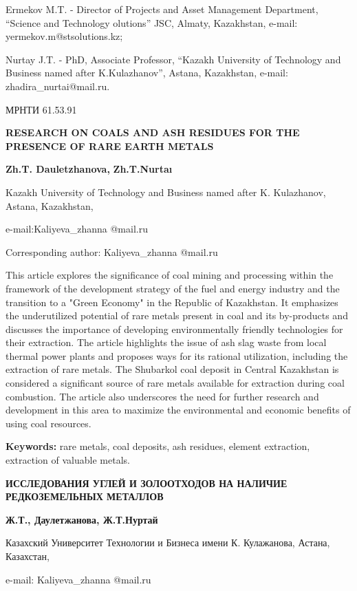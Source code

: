 Ermekov M.T. - Director of Projects and Asset Management Department,
``Science and Technology olutions'' JSC, Almaty, Kazakhstan, e-mail:
yermekov.m@stsolutions.kz;

Nurtay J.T. - PhD, Associate Professor, ``Kazakh University of
Technology and Business named after K.Kulazhanov'', Astana, Kazakhstan,
e-mail: zhadira\_nurtai@mail.ru.

МРНТИ 61.53.91

\textbf{RESEARCH ON COALS AND ASH RESIDUES FOR THE PRESENCE OF RARE
EARTH METALS}

\textbf{Zh.T. Dauletzhanova,} \textbf{Zh.T.Nurtaı}

Kazakh University of Technology and Business named after K. Kulazhanov,
Astana, Kazakhstan,

e-mail:Kaliyeva\_zhanna @mail.ru

Corresponding author: Kaliyeva\_zhanna @mail.ru

This article explores the significance of coal mining and processing
within the framework of the development strategy of the fuel and energy
industry and the transition to a "Green Economy" in the Republic of
Kazakhstan. It emphasizes the underutilized potential of rare metals
present in coal and its by-products and discusses the importance of
developing environmentally friendly technologies for their extraction.
The article highlights the issue of ash slag waste from local thermal
power plants and proposes ways for its rational utilization, including
the extraction of rare metals. The Shubarkol coal deposit in Central
Kazakhstan is considered a significant source of rare metals available
for extraction during coal combustion. The article also underscores the
need for further research and development in this area to maximize the
environmental and economic benefits of using coal resources.

\textbf{Keywords:} rare metals, coal deposits, ash residues, element
extraction, extraction of valuable metals.

\textbf{ИССЛЕДОВАНИЯ УГЛЕЙ И ЗОЛООТХОДОВ НА НАЛИЧИЕ РЕДКОЗЕМЕЛЬНЫХ
МЕТАЛЛОВ}

\textbf{Ж.Т., Даулетжанова, Ж.Т.Нуртай}

Казахский Университет Технологии и Бизнеса имени К. Кулажанова, Астана,
Казахстан,

e-mail: Kaliyeva\_zhanna @mail.ru

